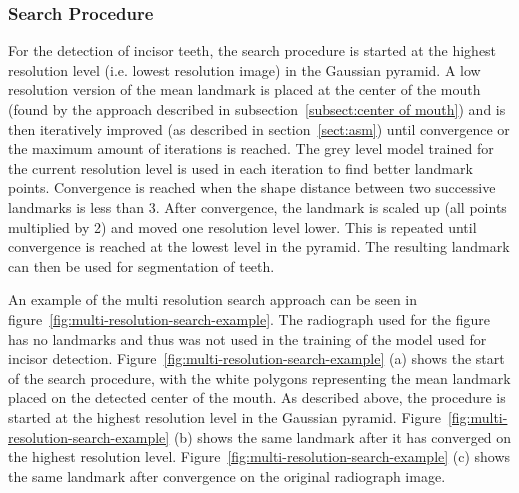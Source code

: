 \documentclass[a4paper]{article}
\begin{document}
\subsubsection{Search Procedure}
For the detection of incisor teeth, the search procedure is started at the highest resolution level (i.e. lowest resolution image) in the Gaussian pyramid.
A low resolution version of the mean landmark is placed at the center of the mouth (found by the approach described in subsection~\ref{subsect:center of mouth}) and is then iteratively improved (as described in section~\ref{sect:asm}) until convergence or the maximum amount of iterations is reached.
The grey level model trained for the current resolution level is used in each iteration to find better landmark points.
Convergence is reached when the shape distance between two successive landmarks is less than 3.
After convergence, the landmark is scaled up (all points multiplied by 2) and moved one resolution level lower.
This is repeated until convergence is reached at the lowest level in the pyramid.
The resulting landmark can then be used for segmentation of teeth.

An example of the multi resolution search approach can be seen in figure~\ref{fig:multi-resolution-search-example}.
The radiograph used for the figure has no landmarks and thus was not used in the training of the model used for incisor detection. 
Figure~\ref{fig:multi-resolution-search-example} (a) shows the start of the search procedure, with the white polygons representing the mean landmark placed on the detected center of the mouth. 
As described above, the procedure is started at the highest resolution level in the Gaussian pyramid. 
Figure~\ref{fig:multi-resolution-search-example} (b) shows the same landmark after it has converged on the highest resolution level. 
Figure~\ref{fig:multi-resolution-search-example} (c) shows the same landmark after convergence on the original radiograph image.
\end{document}

